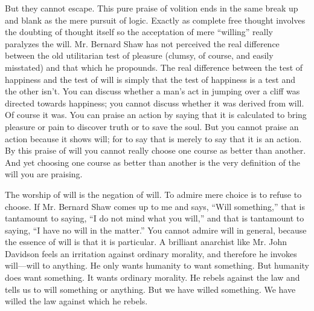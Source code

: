 \documentclass{book}
\begin{document}
But they cannot escape. This pure praise of volition ends in the same break up and blank as the mere pursuit of logic. Exactly as complete free thought involves the doubting of thought itself so the acceptation of mere “willing” really paralyzes the will. Mr. Bernard Shaw has not perceived the real difference between the old utilitarian test of pleasure (clumsy, of course, and easily misstated) and that which he propounds. The real difference between the test of happiness and the test of will is simply that the test of happiness is a test and the other isn’t. You can discuss whether a man’s act in jumping over a cliff was directed towards happiness; you cannot discuss whether it was derived from will. Of course it was. You can praise an action by saying that it is calculated to bring pleasure or pain to discover truth or to save the soul. But you cannot praise an action because it shows will; for to say that is merely to say that it is an action. By this praise of will you cannot really choose one course as better than another. And yet choosing one course as better than another is the very definition of the will you are praising.

The worship of will is the negation of will. To admire mere choice is to refuse to choose. If Mr. Bernard Shaw comes up to me and says, “Will something,” that is tantamount to saying, “I do not mind what you will,” and that is tantamount to saying, “I have no will in the matter.” You cannot admire will in general, because the essence of will is that it is particular. A brilliant anarchist like Mr. John Davidson feels an irritation against ordinary morality, and therefore he invokes will—will to anything. He only wants humanity to want something. But humanity does want something. It wants ordinary morality. He rebels against the law and tells us to will something or anything. But we have willed something. We have willed the law against which he rebels.
\end{document}
